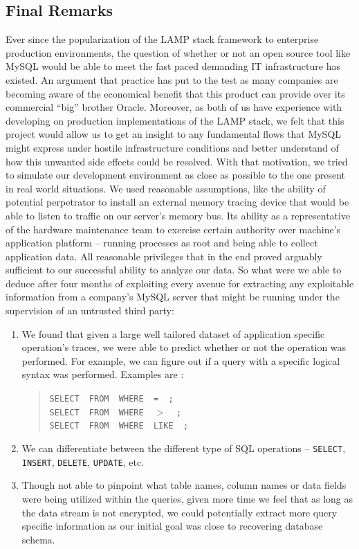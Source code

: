 \documentclass[11pt, oneside]{article}
\begin{document}
\subsection{Final Remarks}
Ever since the popularization of the LAMP stack framework to enterprise 
production environments, the question of whether or not an open source tool 
like MySQL would be able to meet the fast paced demanding IT infrastructure 
has existed. An argument that practice has put to the test as many companies 
are becoming aware of the economical benefit that this product can provide 
over its commercial “big” brother Oracle. Moreover, as both of us have 
experience with developing on production implementations of the LAMP stack, we 
felt that this project would allow us to get an insight to any fundamental 
flows that MySQL might express under hostile infrastructure conditions and 
better understand of how this unwanted side effects could be resolved. With 
that motivation, we tried to simulate our development environment as close as 
possible to the one present in real world situations. We used reasonable 
assumptions, like the ability of potential perpetrator to install an external 
memory tracing device that would be able to listen to traffic on our server's 
memory bus. Its ability as a representative of the hardware maintenance team 
to exercise certain authority over machine's application platform – running 
processes as root and being able to collect application data. All reasonable 
privileges that in the end proved arguably sufficient to our successful 
ability to analyze our data.
So what were we able to deduce after four months of exploiting every avenue 
for extracting any exploitable information from a company's MySQL server that 
might be running under the supervision of an untrusted third party:

\begin{enumerate}
\item We found that given a large well tailored dataset of application 
specific operation's traces, we were able to predict whether or not the 
operation was performed. For example, we can figure out if a query with a 
specific logical syntax was performed. Examples are :
\def\smalldash{\underbar{\hskip .3in}~}
\begin{quote}
{\tt SELECT \smalldash FROM \smalldash WHERE \smalldash = \smalldash;} \\
{\tt SELECT \smalldash FROM \smalldash WHERE \smalldash $>$ \smalldash;} \\
{\tt SELECT \smalldash FROM \smalldash WHERE \smalldash LIKE \smalldash;}
\end{quote}
\item We can differentiate between the different type of SQL operations – 
{\tt SELECT}, {\tt INSERT}, {\tt DELETE}, {\tt UPDATE}, etc.
      
\item Though not able to pinpoint what table names, column names or data 
fields were being utilized within the queries, given more time we feel that as 
long as the data stream is not encrypted, we could potentially extract more 
query specific information as our initial goal was close to recovering 
database schema.
\end{enumerate}
\end{document}
